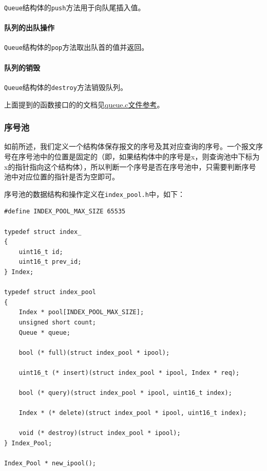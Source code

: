 \documentclass[lang=cn,11pt,a4paper,cite=authornum]{paper}
\begin{document}
\texttt{Queue}结构体的\texttt{push}方法用于向队尾插入值。

\paragraph{队列的出队操作}

\texttt{Queue}结构体的\texttt{pop}方法取出队首的值并返回。

\paragraph{队列的销毁}

\texttt{Queue}结构体的\texttt{destroy}方法销毁队列。

上面提到的函数接口的的文档见\href{run:./APIdoc/queue_8c.html}{queue.c文件参考}。

\subsubsection{序号池}

如前所述，我们定义一个结构体保存报文的序号及其对应查询的序号。一个报文序号在序号池中的位置是固定的（即，如果结构体中的序号是x，则查询池中下标为x的指针指向这个结构体），所以判断一个序号是否在序号池中，只需要判断序号池中对应位置的指针是否为空即可。

序号池的数据结构和操作定义在\texttt{index_pool.h}中，如下：

\begin{code}
\begin{verbatim}
#define INDEX_POOL_MAX_SIZE 65535

typedef struct index_
{
    uint16_t id; 
    uint16_t prev_id; 
} Index;
 
typedef struct index_pool
{
    Index * pool[INDEX_POOL_MAX_SIZE]; 
    unsigned short count; 
    Queue * queue; 
    
    bool (* full)(struct index_pool * ipool);
    
    uint16_t (* insert)(struct index_pool * ipool, Index * req);
    
    bool (* query)(struct index_pool * ipool, uint16_t index);
    
    Index * (* delete)(struct index_pool * ipool, uint16_t index);
    
    void (* destroy)(struct index_pool * ipool);
} Index_Pool;
 
Index_Pool * new_ipool();
\end{verbatim}
\end{code}
\end{document}
